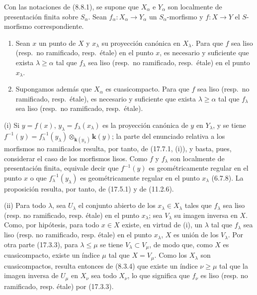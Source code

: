 \begin{proposition}[17.7.8]
\label{IV.17.7.8}
Con las notaciones de \textup{(8.8.1)}, se supone que $X_\alpha$ e $Y_\alpha$ son localmente de presentación finita sobre $S_\alpha$. Sean $f_\alpha:X_\alpha\to Y_\alpha$ un $S_\alpha$-morfismo y $f:X\to Y$ el $S$-morfismo correspondiente.
\begin{enumerate}
  \item[\textup{(i)}] Sean $x$ un punto de $X$ y $x_\lambda$ su proyección canónica en $X_\lambda$. Para que $f$ sea liso \textup{(resp.}\ no ramificado, \textup{resp.}\ étale\textup{)} en el punto $x$, es necesario y suficiente que exista $\lambda\geq\alpha$ tal que $f_\lambda$ sea liso \textup{(resp.}\ no ramificado, \textup{resp.}\ étale\textup{)} en el punto $x_\lambda$.
  \item[\textup{(ii)}] Supongamos además que $X_\alpha$ es cuasicompacto. Para que $f$ sea liso \textup{(resp.}\ no ramificado, \textup{resp.}\ étale\textup{)}, es necesario y suficiente que exista $\lambda\geq\alpha$ tal que $f_\lambda$ sea liso \textup{(resp.}\ no ramificado, \textup{resp.}\ étale\textup{)}.
\end{enumerate}
\end{proposition}

(i) Si $y=f(x)$, $y_\lambda=f_\lambda(x_\lambda)$ es la proyección canónica de $y$ en $Y_\lambda$, y se tiene $f^{-1}(y)=f_\lambda^{-1}(y_\lambda)\otimes_{\mathbf k(y_\lambda)}\boldsymbol k(y)$; la parte del enunciado relativa a los morfismos no ramificados resulta, por tanto, de (17.7.1, (i)), y basta, pues, considerar el caso de los morfismos lisos. Como $f$ y $f_\lambda$ son localmente de presentación finita, equivale decir que $f^{-1}(y)$ es geométricamente regular en el punto $x$ o que $f_\lambda^{-1}(y_\lambda)$ es geométricamente regular en el punto $x_\lambda$ (6.7.8). La proposición resulta, por tanto, de (17.5.1) y de (11.2.6).

(ii) Para todo $\lambda$, sea $U_\lambda$ el conjunto abierto de los $x_\lambda\in X_\lambda$ tales que $f_\lambda$ sea liso (resp. no ramificado, resp. étale) en el punto $x_\lambda$; sea $V_\lambda$ su imagen inversa en $X$. Como, por hipótesis, para todo $x\in X$ existe, en virtud de (i), un $\lambda$ tal que $f_\lambda$ sea liso (resp. no ramificado, resp. étale) en el punto $x_\lambda$, $X$ es unión de los $V_\lambda$. Por otra parte (17.3.3), para $\lambda\leq\mu$ se tiene $V_\lambda\subset V_\mu$, de modo que, como $X$ es cuasicompacto, existe un índice $\mu$ tal que $X=V_\mu$. Como los $X_\lambda$ son cuasicompactos, resulta entonces de (8.3.4) que existe un índice $\nu\geq\mu$ tal que la imagen inversa de $U_\mu$ en $X_\nu$ sea todo $X_\nu$, lo que significa que $f_\nu$ es liso (resp. no ramificado, resp. étale) por (17.3.3).

